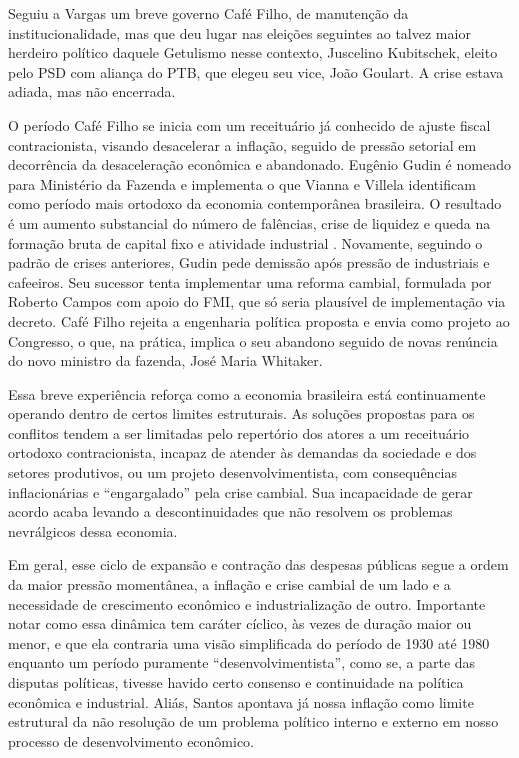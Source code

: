 Seguiu a Vargas um breve governo Café Filho, de manutenção da institucionalidade, mas
que deu lugar nas eleições seguintes ao talvez maior herdeiro político
daquele Getulismo nesse contexto, Juscelino Kubitschek, eleito pelo PSD
com aliança do PTB, que elegeu seu vice, João Goulart. A crise estava
adiada, mas não encerrada.

O período Café Filho se inicia com um receituário já conhecido de ajuste
fiscal contracionista, visando desacelerar a inflação, seguido de
pressão setorial em decorrência da desaceleração econômica e abandonado.
Eugênio Gudin é nomeado para Ministério da Fazenda e implementa 
o que Vianna e Villela \citeyearpar{vianna_o_2025} identificam como período
mais ortodoxo da economia contemporânea brasileira. O resultado é
um aumento substancial do número de falências, crise de liquidez e queda
na formação bruta de capital fixo e atividade industrial \citep{vianna_o_2025}.
Novamente, seguindo o padrão de crises anteriores,
Gudin pede demissão após pressão de industriais e cafeeiros. Seu sucessor tenta
implementar uma reforma cambial, formulada por Roberto Campos com apoio
do FMI, que só seria plausível de implementação via decreto. Café Filho
rejeita a engenharia política proposta e envia como projeto ao
Congresso, o que, na prática, implica o seu abandono \citep{vianna_o_2025}
seguido de novas renúncia do novo ministro da fazenda, José Maria
Whitaker.

Essa breve experiência reforça como a economia brasileira está
continuamente operando dentro de certos limites estruturais. As soluções
propostas para os conflitos tendem a ser limitadas pelo repertório dos
atores a um receituário ortodoxo contracionista, incapaz de atender às
demandas da sociedade e dos setores produtivos, ou um projeto
desenvolvimentista, com consequências inflacionárias e ``engargalado'' pela
crise cambial. Sua incapacidade de gerar acordo acaba levando a
descontinuidades que não resolvem os problemas nevrálgicos dessa
economia.

Em geral, esse ciclo de expansão e contração das despesas públicas segue a
ordem da maior pressão momentânea, a inflação e crise cambial de um lado
e a necessidade de crescimento econômico e industrialização de outro.
Importante notar como essa dinâmica tem caráter cíclico, às vezes de
duração maior ou menor, e que ela contraria uma visão simplificada do
período de 1930 até 1980 enquanto um período puramente ``desenvolvimentista'',
como se, a parte das disputas políticas, tivesse havido certo consenso e
continuidade na política econômica e industrial. Aliás, Santos 
apontava já nossa inflação como limite estrutural da não resolução de um problema político
interno e externo em nosso processo de desenvolvimento econômico.

